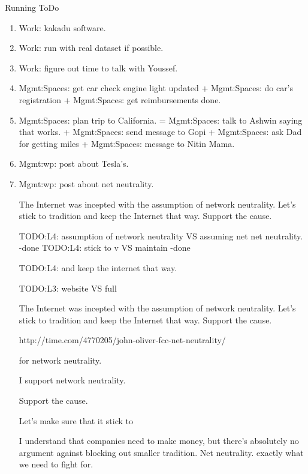 \begin{columns}
\begin{column}{0.333\columnwidth}
\begin{columns}
\begin{column}{0.6\linewidth}
\begin{block}{Running ToDo}
\begin{enumerate}
          \item \tiny Work: kakadu software. 

          \item \tiny Work: run with real dataset if possible. 
          \item \tiny Work: figure out time to talk with Youssef.

          \item \tiny Mgmt:Spaces: get car check engine light updated
            + Mgmt:Spaces: do car's registration + Mgmt:Spaces: get
            reimbursements done. 

          \item \tiny Mgmt:Spaces: plan trip  to California. =
            Mgmt:Spaces: talk to Ashwin saying that works.  +
            Mgmt:Spaces: send message to Gopi + 
            Mgmt:Spaces: ask Dad for getting miles + Mgmt:Spaces:
            message to Nitin Mama.

           \item \tiny Mgmt:wp: post about Tesla's. 

            \item \tiny Mgmt:wp: post about net neutrality. 

            The Internet was incepted with the assumption of network
            neutrality. Let's stick to tradition and keep the Internet
            that way. Support the cause.

            TODO:L4: assumption of network neutrality VS assuming net
            net neutrality.  -done 
            TODO:L4: stick to v VS maintain  -done 

            TODO:L4: and keep the internet that way. 

            TODO:L3: website VS full




The Internet was incepted with the assumption of network neutrality. Let's
stick to tradition and keep the Internet that way. Support the cause.

http://time.com/4770205/john-oliver-fcc-net-neutrality/


for network  neutrality.

I support network neutrality.

Support the cause. 


Let's make sure that it stick to 

            I understand that companies need to make money, but
            there's absolutely no argument against blocking out
            smaller 
            tradition.  Net neutrality. exactly what we need to fight
            for.
 

\end{enumerate}
\end{block}
\end{column}
\end{columns}
\end{column}
\end{columns}
